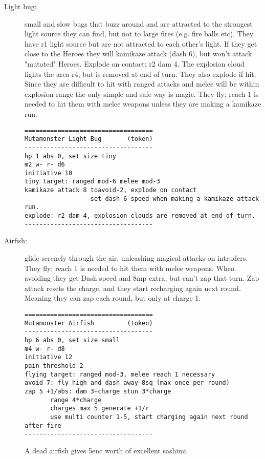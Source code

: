 \begin{description}

\item[Light bug:] small and slow bugs that buzz around and are attracted to the strongest light source they can find, but not to large fires (e.g. fire balls etc). They have r1 light source but are not attracted to each other's light. If they get close to the Heroes they will kamikaze attack (dash 6), but won't attack "mutated" Heroes. Explode on contact: r2 dam 4. The explosion cloud lights the area r4, but is removed at end of turn.
They also explode if hit. Since they are difficult to hit with ranged attacks and melee will be within explosion range the only simple and safe way is magic.
They fly: reach 1 is needed to hit them with melee weapons unless they are making a kamikaze run.
\goodbreak \begin{samepage} \small \begin{verbatim}
===================================
Mutamonster Light Bug       (token)
-----------------------------------
hp 1 abs 0, set size tiny
m2 w- r- d6
initiative 10
tiny target: ranged mod-6 melee mod-3
kamikaze attack 8 toavoid-2, explode on contact
                  set dash 6 speed when making a kamikaze attack run.
explode: r2 dam 4, explosion clouds are removed at end of turn.
-----------------------------------
\end{verbatim} \normalsize \end{samepage}


\item[Airfish:] glide serenely through the air, unleashing magical attacks on intruders. They fly: reach 1 is needed to hit them with melee weapons.
When avoiding they get Dash speed and 8mp extra, but can't zap that turn.
Zap attack resets the charge, and they start recharging again next round. Meaning they can zap each round, but only at charge 1.
\goodbreak \begin{samepage} \small \begin{verbatim}
===================================
Mutamonster Airfish         (token)
-----------------------------------
hp 6 abs 0, set size small
m4 w- r- d8
initiative 12
pain threshold 2
flying target: ranged mod-3, melee reach 1 necessary
avoid 7: fly high and dash away 8sq (max once per round)
zap 5 +1/abs: dam 3+charge stun 3*charge
       range 4*charge
       charges max 5 generate +1/r
       use multi counter 1-5, start charging again next round after fire
-----------------------------------
\end{verbatim} \normalsize \end{samepage}
A dead airfish gives 5enc worth of excellent sashimi.



\end{description}
